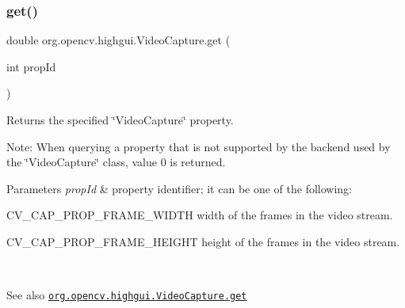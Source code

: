 \mbox{\label{classorg_1_1opencv_1_1highgui_1_1_video_capture_ab31e0dd0ba5df72ba518944ae09c1b28}} 
\subsubsection{\texorpdfstring{get()}{get()}}
{\footnotesize\ttfamily double org.\+opencv.\+highgui.\+Video\+Capture.\+get (\begin{DoxyParamCaption}\item[{int}]{prop\+Id }\end{DoxyParamCaption})}

Returns the specified \char`\"{}\+Video\+Capture\char`\"{} property.

Note\+: When querying a property that is not supported by the backend used by the \char`\"{}\+Video\+Capture\char`\"{} class, value 0 is returned.


\begin{DoxyParams}{Parameters}
{\em prop\+Id} & property identifier; it can be one of the following\+:
\begin{DoxyItemize}
\item C\+V\+\_\+\+C\+A\+P\+\_\+\+P\+R\+O\+P\+\_\+\+F\+R\+A\+M\+E\+\_\+\+W\+I\+D\+TH width of the frames in the video stream.
\item C\+V\+\_\+\+C\+A\+P\+\_\+\+P\+R\+O\+P\+\_\+\+F\+R\+A\+M\+E\+\_\+\+H\+E\+I\+G\+HT height of the frames in the video stream.
\end{DoxyItemize}\\
\hline
\end{DoxyParams}
\begin{DoxySeeAlso}{See also}
\href{http://docs.opencv.org/modules/highgui/doc/reading_and_writing_images_and_video.html#videocapture-get}{\tt org.\+opencv.\+highgui.\+Video\+Capture.\+get} 
\end{DoxySeeAlso}
\mbox{\label{classorg_1_1opencv_1_1highgui_1_1_video_capture_af645d9aa2b7849cfe13664b7b064ab8f}} 

